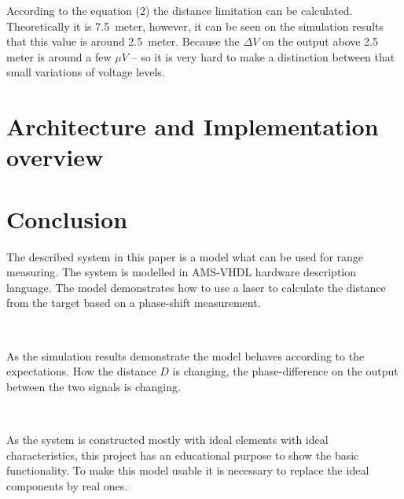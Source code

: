 \documentclass[fleqn]{article}
\begin{document}
According to the equation (2) the distance limitation can be calculated. Theoretically it is 7.5 meter, however, it can be seen on the simulation results that this value is around 2.5 meter. Because the $\Delta V$ on the output above 2.5 meter is around a few $\mu V$ – so it is very hard to make a distinction between that small variations of voltage levels.

\section{Architecture and Implementation overview}


\section{Conclusion}

The described system in this paper is a model what can be used for range measuring. The system is modelled in AMS-VHDL hardware description language. The model demonstrates how to use a laser to calculate the distance from the target based on a phase-shift measurement.

~

As the simulation results demonstrate the model behaves according to the expectations. How the distance $D$ is changing, the phase-difference on the output between the two signals is changing.

~

As the system is constructed mostly with ideal elements with ideal characteristics, this project has an educational purpose to show the basic functionality. To make this model usable it is necessary to replace the ideal components by real ones.
\end{document}
